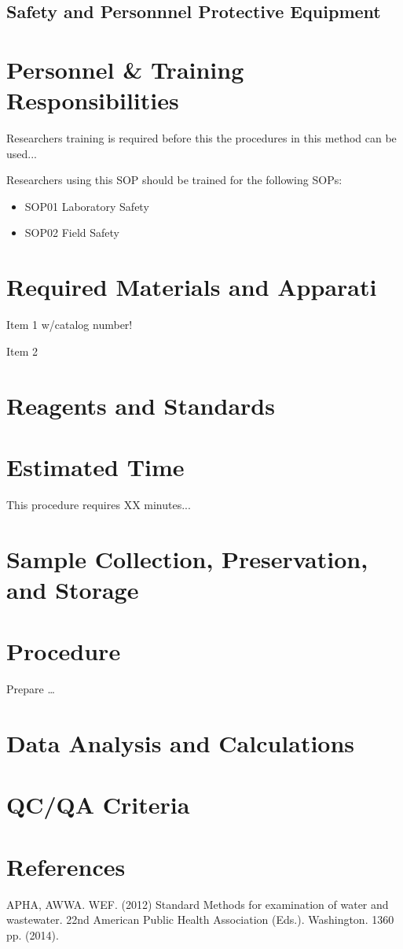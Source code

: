 \documentclass[12pt]{../SOP3_alpha}
\begin{document}
\subsection*{Safety and Personnnel Protective Equipment}


\section{Personnel \& Training Responsibilities}

\NP Researchers training is required before this the procedures in this method can be used... 

\NP Researchers using this SOP should be trained for the following SOPs:

\begin{itemize}
  \item SOP01 Laboratory Safety
  \item SOP02 Field Safety
\end{itemize}

\section{Required Materials and Apparati}

\NP Item 1 w/catalog number!

\NP Item 2

\section{Reagents and Standards}

\section{Estimated Time}

\NP This procedure requires XX minutes...

\section{Sample Collection, Preservation, and Storage}

\section{Procedure}

\NP Prepare \dots

\NP

\section{Data Analysis and Calculations}

\section{QC/QA Criteria}

\section{References}

\NP APHA, AWWA. WEF. (2012) Standard Methods for examination of water and wastewater. 22nd American Public Health Association (Eds.). Washington. 1360 pp. (2014).
\end{document}
